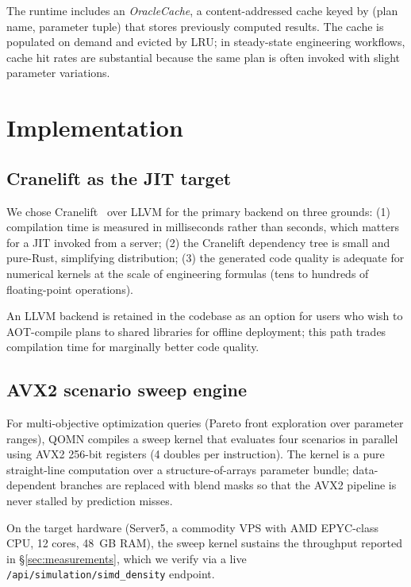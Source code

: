 \documentclass[11pt,a4paper]{article}
\begin{document}
The runtime includes an \emph{OracleCache}, a content-addressed cache keyed by (plan name, parameter tuple) that stores previously computed results. The cache is populated on demand and evicted by LRU; in steady-state engineering workflows, cache hit rates are substantial because the same plan is often invoked with slight parameter variations.

\section{Implementation}
\label{sec:impl}

\subsection{Cranelift as the JIT target}

We chose Cranelift~\cite{cranelift} over LLVM for the primary backend on three grounds: (1) compilation time is measured in milliseconds rather than seconds, which matters for a JIT invoked from a server; (2) the Cranelift dependency tree is small and pure-Rust, simplifying distribution; (3) the generated code quality is adequate for numerical kernels at the scale of engineering formulas (tens to hundreds of floating-point operations).

An LLVM backend is retained in the codebase as an option for users who wish to AOT-compile plans to shared libraries for offline deployment; this path trades compilation time for marginally better code quality.

\subsection{AVX2 scenario sweep engine}

For multi-objective optimization queries (Pareto front exploration over parameter ranges), QOMN compiles a sweep kernel that evaluates four scenarios in parallel using AVX2 256-bit registers (4 doubles per instruction). The kernel is a pure straight-line computation over a structure-of-arrays parameter bundle; data-dependent branches are replaced with blend masks so that the AVX2 pipeline is never stalled by prediction misses.

On the target hardware (Server5, a commodity VPS with AMD EPYC-class CPU, 12 cores, 48~GB RAM), the sweep kernel sustains the throughput reported in \S\ref{sec:measurements}, which we verify via a live \texttt{/api/simulation/simd\_density} endpoint.
\end{document}
